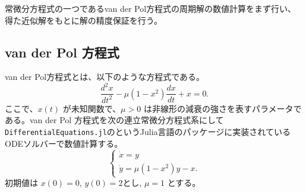 
%

常微分方程式の一つであるvan der Pol方程式の周期解の数値計算をまず行い、得た近似解をもとに解の精度保証を行う。

\subsection{van der Pol 方程式}
van der Pol方程式とは、以下のような方程式である。
$$
\frac{d^2 x}{dt^2} - \mu (1-x^2)\frac{dx}{dt} + x = 0.
$$
ここで、$x(t)$ が未知関数で、$\mu>0$ は非線形の減衰の強さを表すパラメータである。van der Pol 方程式を次の連立常微分方程式系にして\texttt{DifferentialEquations.jl}のというJulia言語のパッケージ\cite{DEjl}に実装されているODEソルバーで数値計算する。
$$
\begin{cases}
\dot{x} = y\\
\dot{y} = \mu (1-x^2)y - x.
\end{cases}
$$
初期値は $x(0)=0$, $y(0)=2$とし, $\mu=1$ とする。


